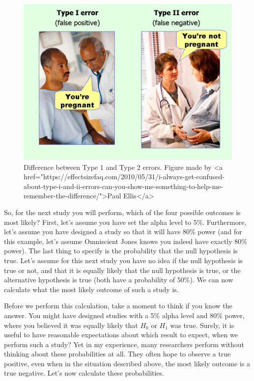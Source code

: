 \documentclass[
  oneside]{krantz}
\begin{document}
\begin{figure}

{\centering \includegraphics[width=1\linewidth]{images/type1type2error} 

}

\caption{Difference between Type 1 and Type 2 errors. Figure made by <a href="https://effectsizefaq.com/2010/05/31/i-always-get-confused-about-type-i-and-ii-errors-can-you-show-me-something-to-help-me-remember-the-difference/">Paul Ellis</a>}\label{fig:errortypes}
\end{figure}

So, for the next study you will perform, which of the four possible outcomes is most likely? First, let's assume you have set the alpha level to 5\%. Furthermore, let's assume you have designed a study so that it will have 80\% power (and for this example, let's assume Omniscient Jones knows you indeed have exactly 80\% power). The last thing to specify is the probability that the null hypothesis is true. Let's assume for this next study you have no idea if the null hypothesis is true or not, and that it is equally likely that the null hypothesis is true, or the alternative hypothesis is true (both have a probability of 50\%). We can now calculate what the most likely outcome of such a study is.

Before we perform this calculation, take a moment to think if you know the answer. You might have designed studies with a 5\% alpha level and 80\% power, where you believed it was equally likely that \(H_0\) or \(H_1\) was true. Surely, it is useful to have reasonable expectations about which result to expect, when we perform such a study? Yet in my experience, many researchers perform without thinking about these probabilities at all. They often hope to observe a true positive, even when in the situation described above, the most likely outcome is a true negative. Let's now calculate these probabilities.
\end{document}
